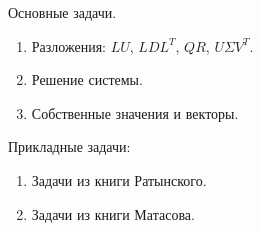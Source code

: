 \documentclass[a4paper,12pt]{report}
\begin{document}
    Основные задачи.
    \begin{enumerate}
        \item Разложения: $LU$, $LDL^T$, $QR$, $U \Sigma V^T$.
        \item Решение системы.
        \item Собственные значения и векторы.
    \end{enumerate}

    Прикладные задачи:
    \begin{enumerate}
        \item Задачи из книги Ратынского.
        \item Задачи из книги Матасова.
    \end{enumerate}
\end{document}
